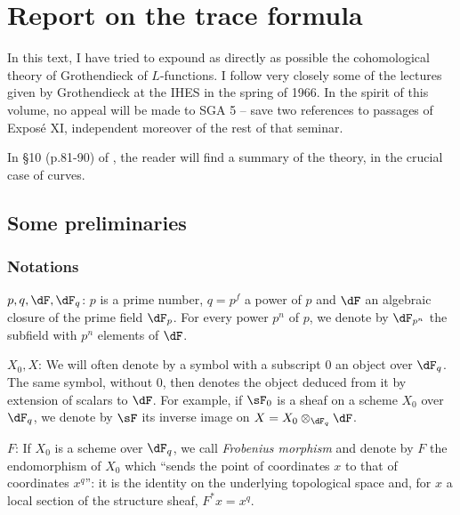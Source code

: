 
\chapter{Report on the trace formula}\label{II}

In this text, I have tried to expound as directly as possible the
cohomological theory of Grothendieck of $L$-functions. I follow very closely
some of the lectures given by Grothendieck at the IHES in the spring of 1966. In
the spirit of this volume, no appeal will be made to SGA 5 -- save two
references to passages of Expos\'e XI, independent moreover of the rest of that
seminar.

In \S 10 (p.81-90) of \cite{de73}, the reader will find a summary of the
theory, in the crucial case of curves.










\section{Some preliminaries}\label{II:1}




\subsection{Notations}\label{II:1-1}

$p,q,\dF,\dF_q$: $p$ is a prime number, $q=p^f$ a power of $p$ and
$\dF$ an algebraic closure of the prime field $\dF_p$. For every power
$p^n$ of $p$, we denote by $\dF_{p^n}$ the subfield with $p^n$ elements of $\dF$.

$X_0,X$: We will often denote by a symbol with a subscript $0$ an object
over $\dF_q$. The same symbol, without $0$, then denotes the object deduced
from it by extension of scalars to $\dF$. For example, if $\sF_0$ is a sheaf
on a scheme $X_0$ over $\dF_q$, we denote by $\sF$ its inverse image on
$X=X_0\otimes_{\dF_q} \dF$.

$F$: If $X_0$ is a scheme over $\dF_q$, we call \emph{Frobenius
morphism} and denote by $F$ the endomorphism of $X_0$ which ``sends the point of
coordinates $x$ to that of coordinates $x^q$'': it is the identity on
the underlying topological space and, for $x$ a local section of the structure
sheaf, $F^* x = x^q$.


